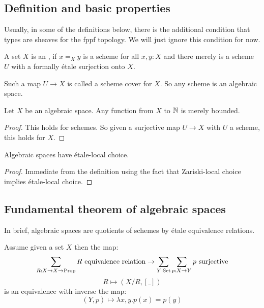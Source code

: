 \subsection{Definition and basic properties}

Usually, in some of the definitions below,
there is the additional condition that types are sheaves for the fppf topology.
We will just ignore this condition for now.

\begin{definition}
  A set $X$ is an ,
  if $x=_Xy$ is a scheme for all $x,y:X$ and
  there merely is a scheme $U$ with a formally étale surjection onto $X$.
\end{definition}

Such a map $U\to X$ is called a scheme cover for $X$. So any scheme is an algebraic space.

\begin{lemma}
Let $X$ be an algebraic space. Any function from $X$ to $\mathbb{N}$ is merely bounded.
\end{lemma}

\begin{proof}
  This holds for schemes.
  So given a surjective map $U\to X$ with $U$ a scheme, this holds for $X$.
\end{proof}

\begin{lemma}
Algebraic spaces have étale-local choice.
\end{lemma}

\begin{proof}
Immediate from the definition using the fact that Zariski-local choice implies étale-local choice.
\end{proof}

\subsection{Fundamental theorem of algebraic spaces}

In brief, algebraic spaces are quotients of schemes by étale equivalence relations.

\begin{lemma}\label{quotient-by-equivalence-relation}
Assume given a set $X$ then the map:
\[ \sum_{R:X\to X\to \Prop} R\ \mathrm{equivalence\ relation} \to \sum_{Y:\mathrm{Set}} \sum_{p:X\to Y} p\ \mathrm{surjective}\]
\[R \mapsto (X/R,[\_])\]
is an equivalence with inverse the map:
\[(Y,p) \mapsto \lambda x,y. p(x)=p(y)\]
\end{lemma}

